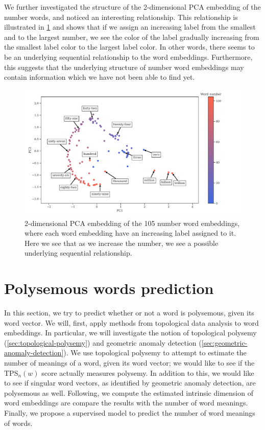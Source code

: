 We further investigated the structure of the 2-dimensional PCA embedding of the number words, and noticed an interesting relationship. This relationship is illustrated in \cref{fig:ordered-number-word-embeddings-2d-pca} and shows that if we assign an increasing label from the smallest and to the largest number, we see the color of the label gradually increasing from the smallest label color to the largest label color. In other words, there seems to be an underlying sequential relationship to the word embeddings. Furthermore, this suggests that the underlying structure of number word embeddings may contain information which we have not been able to find yet.
\begin{figure}[H]
    \centering
    \includegraphics[width=\textwidth]{thesis/figures/ordered-number-word-embeddings-2d-pca.pdf}
    \caption{2-dimensional PCA embedding of the 105 number word embeddings, where each word embedding have an increasing label assigned to it. Here we see that as we increase the number, we see a possible underlying sequential relationship.}
    \label{fig:ordered-number-word-embeddings-2d-pca}
\end{figure}

\section{Polysemous words prediction}
\label{sec:analysis-of-embeddings-tda}
In this section, we try to predict whether or not a word is polysemous, given its word vector. We will, first, apply methods from topological data analysis to word embeddings. In particular, we will investigate the notion of topological polysemy (\cref{sec:topological-polysemy}) and geometric anomaly detection (\cref{sec:geometric-anomaly-detection}). We use topological polysemy to attempt to estimate the number of meanings of a word, given its word vector; we would like to see if the $\text{TPS}_n(w)$ score actually measures polysemy. In addition to this, we would like to see if singular word vectors, as identified by geometric anomaly detection, are polysemous as well. Following, we compute the estimated intrinsic dimension of word embeddings are compare the results with the number of word meanings. Finally, we propose a supervised model to predict the number of word meanings of words.

